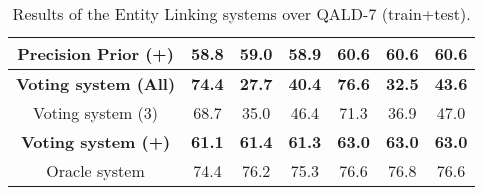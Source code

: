 \begin{table}[h!]
{\begin{tabular}{|c|ccc|ccc|}
    Precision Prior (+)              & 58.8                                 & 59.0                                    & 58.9              & 60.6                                 & 60.6                                    & 60.6              \\ \hline
    \textbf{Voting system (All)}     & \textbf{74.4}                        & \textbf{27.7}                           & \textbf{40.4}     & \textbf{76.6}                        & \textbf{32.5}                           & \textbf{43.6}     \\
    Voting system (3)                & 68.7                                 & 35.0                                    & 46.4              & 71.3                                 & 36.9                                    & 47.0              \\
    \textbf{Voting system (+)}       & \textbf{61.1}                        & \textbf{61.4}                           & \textbf{61.3}     & \textbf{63.0}                        & \textbf{63.0}                           & \textbf{63.0}     \\ \hline
    Oracle system                    & 74.4                                 & 76.2                                    & 75.3              & 76.6                                 & 76.8                                    & 76.6              \\ \hline
    \end{tabular}%
    }
    \caption{ Results of the Entity Linking systems over QALD-7 (train+test).}
    \label{table:elResultsQald7}
\end{table}

